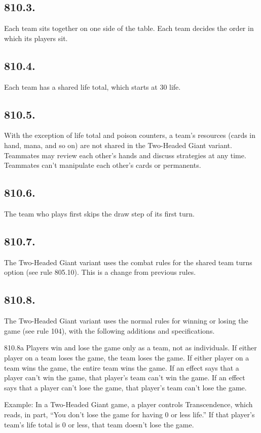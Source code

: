\subsection*{810.3.}
Each team sits together on one side of the table. Each team decides the order in which its players sit.

\subsection*{810.4.}
Each team has a shared life total, which starts at 30 life.

\subsection*{810.5.}
With the exception of life total and poison counters, a team’s resources (cards in hand, mana, and so on) are not shared in the Two-Headed Giant variant. Teammates may review each other’s hands and discuss strategies at any time. Teammates can’t manipulate each other’s cards or permanents.

\subsection*{810.6.}
The team who plays first skips the draw step of its first turn.

\subsection*{810.7.}
The Two-Headed Giant variant uses the combat rules for the shared team turns option (see rule 805.10). This is a change from previous rules.

\subsection*{810.8.}
The Two-Headed Giant variant uses the normal rules for winning or losing the game (see rule 104), with the following additions and specifications.

810.8a Players win and lose the game only as a team, not as individuals. If either player on a team loses the game, the team loses the game. If either player on a team wins the game, the entire team wins the game. If an effect says that a player can’t win the game, that player’s team can’t win the game. If an effect says that a player can’t lose the game, that player’s team can’t lose the game.

Example: In a Two-Headed Giant game, a player controls Transcendence, which reads, in part, “You don’t lose the game for having 0 or less life.” If that player’s team’s life total is 0 or less, that team doesn’t lose the game.

